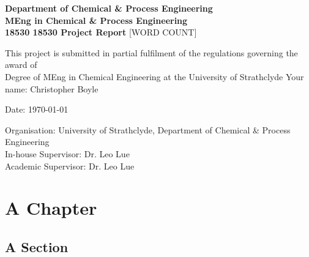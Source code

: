 \documentclass{report}
\author{Christopher Boyle}
\def\thetitle{18530 Project Report}
\begin{document}
\begin{titlepage}
\centering
\vfill
{\bfseries\Large
Department of Chemical \& Process Engineering\\
\vskip1cm
MEng in Chemical \& Process Engineering\\
18530
\vskip2cm
\thetitle
}
\vskip2cm
[WORD COUNT]
\vskip1cm
\begin{flushleft}
This project is submitted in partial fulfilment of the regulations governing the award of \\
Degree of MEng in Chemical Engineering at the University of Strathclyde
\vfill
Your name: Christopher Boyle%
\begin{flushright}
	Date: \today
\end{flushright}
\vskip1cm
Organisation: University of Strathclyde, Department of Chemical \& Process Engineering\\
In-house Supervisor: Dr. Leo Lue\\
Academic Supervisor: Dr. Leo Lue\\
\end{flushleft}
\vfill
\end{titlepage}


\fontsize{10}{0}




\tableofcontents

\chapter{A Chapter}

\section{A Section}
\end{document}
